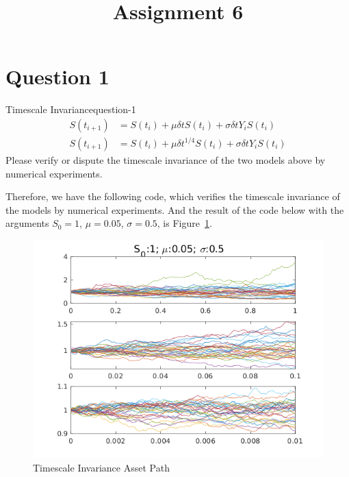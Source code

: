 
\title{Assignment 6}


\section{Question 1}
\begin{statebox}{Timescale Invariance}{question-1}
    \begin{align*}
        S(t_{i+1}) &= S(t_i) + \mu\delta tS(t_i) + \sigma\delta tY_iS(t_i) \\S(t_{i+1}) &= S(t_i) + \mu\delta t^{1/4}S(t_i) + \sigma\delta tY_iS(t_i)
    \end{align*}
    Please verify or dispute the timescale invariance of the two models above by numerical experiments.
\end{statebox}

Therefore, we have the following code, which verifies the timescale invariance of the models by numerical experiments. And the result of the code below with the arguments $S_0=1$, $\mu=0.05$, $\sigma=0.5$, is Figure~\ref{F:1}.

\lstset{showspaces=false, showtabs=false, tabsize=2, framexleftmargin=5mm, frame=shadowbox, numbers=left, numberstyle=\tiny, breakautoindent=false}


\begin{figure}[H]
	\centering
	\includegraphics[width=\textwidth]{figures/2019-10-30-timescale-invariance.png}
	\caption{Timescale Invariance Asset Path}\label{F:1}
\end{figure}
